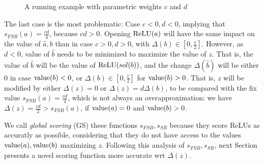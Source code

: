 {\begin{figure}[t!]
	\vspace{-0.8cm}
	\caption{A running example with parametric weights {\color{red}$c$} and {\color{red}$d$}}
	\label{img:FSB_example}
\end{figure}



The last case is the most problematic: 
Case $c<0,d<0$, implying that $s_{FSB}(a)=\frac{cd}{4}$, because $cd >0$.
Opening $\mathrm{ReLU}(a)$ will have the same impact on the value of $\hat{a},b$ 
than in case $c>0,d>0$, with $\Delta(b) \in [0,\frac{c}{2}]$.
However, as $d<0$, value of $\hat{b}$ needs to be minimized to maximize the value of $z$. That is, the value of $\hat{b}$ will be the value of $\mathrm{ReLU}(sol(b))$, and the change 
$\Delta(\hat{b})$ will be either 0 in case ${\textrm{value}}(b)<0$,
or $\Delta(b) \in [0,\frac{c}{2}]$ for ${\textrm{value}}(b)>0$.
That is, $z$ will be modified by either $\Delta(z)=0$ or $\Delta(z) = d \Delta(b)$, to be compared with the fix value $s_{FSB}(a)=\frac{cd}{4}$, which is not always an overapproximation: we have $\Delta(z)=\frac{cd}{2} > s_{FSB}(a)$, 
if ${\textrm{value}}(a)=0$ and ${\textrm{value}}(b)>0$.

We call {\em global scoring} (GS) these functions $s_{FSB},s_{SR}$  because they score ReLUs as accuratly as possible, considering that they do not have access to the values 
${\textrm{value}}(a),{\textrm{value}}(b)$ maximizing $z$. Following this analysis of $s_{FSB},s_{SR}$, 
next Section presents a novel scoring function more accurate wrt $\Delta(z)$.
	
	}


